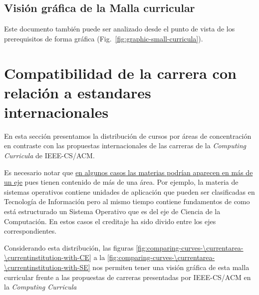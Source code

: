 \begin{landscape}
\section{Visión gráfica de la Malla curricular}\label{sec:graphic-small-curricula}
\vspace{-0.3cm}Este documento también puede ser analizado desde el punto de vista de los 
prerequisitos de forma gráfica (Fig.~\ref{fig:graphic-small-curricula}).

\end{landscape}

\section{Compatibilidad de la carrera con relación a estandares internacionales}
En esta sección presentamos la distribución de cursos por áreas de concentración en 
contraste con las propuestas internacionales de las carreras de la \textit{Computing Curricula} 
de IEEE-CS/ACM.

Es necesario notar que \underline{en algunos casos las materias podrían aparecen en más de un eje} 
pues tienen contenido de más de una área. 
Por ejemplo, la materia de sistemas operativos contiene unidades de aplicación 
que pueden ser clasificadas en Tecnología de Información pero al mismo tiempo contiene fundamentos 
de como está estructurado un Sistema Operativo que es del eje de Ciencia de la Computación. 
En estos casos el creditaje ha sido divido entre los ejes correspondientes.
%

Considerando esta distribución, las figuras \ref{fig:comparing-curves-\currentarea-\currentinstitution-with-CE} 
a la \ref{fig:comparing-curves-\currentarea-\currentinstitution-with-SE} 
nos permiten tener una visión gráfica de esta malla curricular frente a las propuestas de 
carreras presentadas por IEEE-CS/ACM en la \textit{Computing Curricula}

%

%

%
